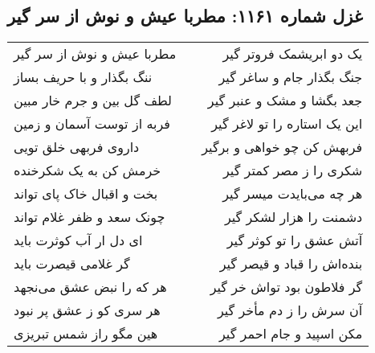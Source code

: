 \begin{center}
\section*{غزل شماره ۱۱۶۱: مطربا عیش و نوش از سر گیر}
\label{sec:1161}
\begin{longtable}{l p{0.5cm} r}
مطربا عیش و نوش از سر گیر
&&
یک دو ابریشمک فروتر گیر
\\
ننگ بگذار و با حریف بساز
&&
جنگ بگذار جام و ساغر گیر
\\
لطف گل بین و جرم خار مبین
&&
جعد بگشا و مشک و عنبر گیر
\\
فربه از توست آسمان و زمین
&&
این یک استاره را تو لاغر گیر
\\
داروی فربهی خلق تویی
&&
فربهش کن چو خواهی و برگیر
\\
خرمش کن به یک شکرخنده
&&
شکری را ز مصر کمتر گیر
\\
بخت و اقبال خاک پای تواند
&&
هر چه می‌بایدت میسر گیر
\\
چونک سعد و ظفر غلام تواند
&&
دشمنت را هزار لشکر گیر
\\
ای دل ار آب کوثرت باید
&&
آتش عشق را تو کوثر گیر
\\
گر غلامی قیصرت باید
&&
بنده‌اش را قباد و قیصر گیر
\\
هر که را نبض عشق می‌نجهد
&&
گر فلاطون بود تواش خر گیر
\\
هر سری کو ز عشق پر نبود
&&
آن سرش را ز دم مأخر گیر
\\
هین مگو راز شمس تبریزی
&&
مکن اسپید و جام احمر گیر
\\
\end{longtable}
\end{center}
